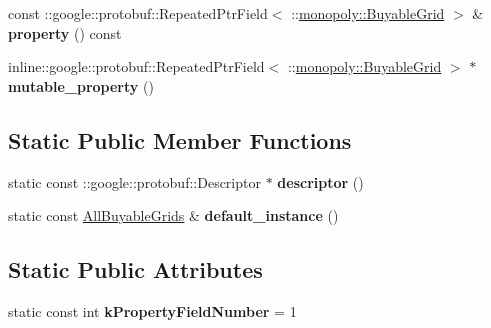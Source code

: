 \begin{DoxyCompactItemize}
\item 
\hypertarget{classmonopoly_1_1_all_buyable_grids_af1ba58f561d30a2750d100b700414732}{}const \+::google\+::protobuf\+::\+Repeated\+Ptr\+Field$<$ \+::\hyperlink{classmonopoly_1_1_buyable_grid}{monopoly\+::\+Buyable\+Grid} $>$ \& {\bfseries property} () const \label{classmonopoly_1_1_all_buyable_grids_af1ba58f561d30a2750d100b700414732}

\item 
\hypertarget{classmonopoly_1_1_all_buyable_grids_ac5e423118960157263a51dd8dae8e979}{}inline\+::google\+::protobuf\+::\+Repeated\+Ptr\+Field$<$ \+::\hyperlink{classmonopoly_1_1_buyable_grid}{monopoly\+::\+Buyable\+Grid} $>$ $\ast$ {\bfseries mutable\+\_\+property} ()\label{classmonopoly_1_1_all_buyable_grids_ac5e423118960157263a51dd8dae8e979}

\end{DoxyCompactItemize}
\subsection*{Static Public Member Functions}
\begin{DoxyCompactItemize}
\item 
\hypertarget{classmonopoly_1_1_all_buyable_grids_aa5eae905b53c66d9a772d29623786836}{}static const \+::google\+::protobuf\+::\+Descriptor $\ast$ {\bfseries descriptor} ()\label{classmonopoly_1_1_all_buyable_grids_aa5eae905b53c66d9a772d29623786836}

\item 
\hypertarget{classmonopoly_1_1_all_buyable_grids_ac006cebc818a4fd6a9dc1cdcffac0926}{}static const \hyperlink{classmonopoly_1_1_all_buyable_grids}{All\+Buyable\+Grids} \& {\bfseries default\+\_\+instance} ()\label{classmonopoly_1_1_all_buyable_grids_ac006cebc818a4fd6a9dc1cdcffac0926}

\end{DoxyCompactItemize}
\subsection*{Static Public Attributes}
\begin{DoxyCompactItemize}
\item 
\hypertarget{classmonopoly_1_1_all_buyable_grids_aec751a706fd7f9cebf5ed2dcadbe9c11}{}static const int {\bfseries k\+Property\+Field\+Number} = 1\label{classmonopoly_1_1_all_buyable_grids_aec751a706fd7f9cebf5ed2dcadbe9c11}

\end{DoxyCompactItemize}
